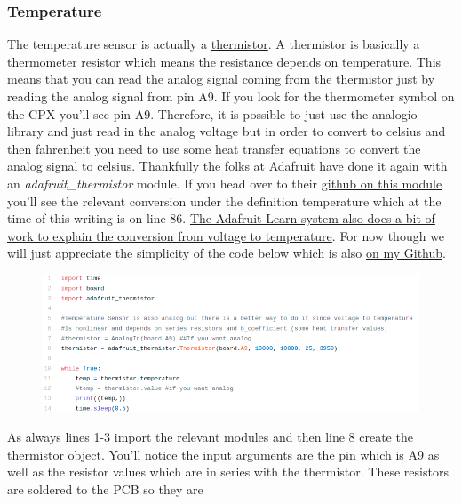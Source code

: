 {\subsubsection{Temperature}
The temperature sensor is actually
a \href{https://en.wikipedia.org/wiki/Thermistor}{thermistor}. A
thermistor is basically a thermometer resistor which means the
resistance depends on temperature. This means that you can read the
analog signal coming from the thermistor just by reading the analog
signal from pin A9. If you look for the thermometer symbol on the CPX
you’ll see pin A9. Therefore, it is possible to just use the analogio
library and just read in the analog voltage but in order to convert to
celsius and then fahrenheit you need to use some heat transfer
equations to convert the analog signal to celsius. Thankfully the
folks at Adafruit have done it again with an {\it
adafruit\_thermistor} module. If you head over to
their \href{https://github.com/adafruit/Adafruit_CircuitPython_Thermistor/blob/master/adafruit_thermistor.py}{github
on this module} you’ll see the relevant conversion under the
definition temperature which at the time of this writing is on line
86. \href{https://learn.adafruit.com/thermistor/circuitpython}{The
Adafruit Learn system also does a bit of work to explain the
conversion from voltage to temperature}. For now though we will just
appreciate the simplicity of the code below which is
also \href{https://github.com/cmontalvo251/Microcontrollers/blob/master/Circuit_Playground/CircuitPython/Temp/record_temperature_thermistor.py}{on
my Github}. 
\begin{figure}[H]
  \begin{center}
    \includegraphics[width=\textwidth]{Figures/thermistor_code.png}
  \end{center}
\end{figure}
As always lines 1-3 import the relevant modules and then line 8 create
the thermistor object. You’ll notice the input arguments are the pin
which is A9 as well as the resistor values which are in series with
the thermistor. These resistors are soldered to the PCB so they are
}
